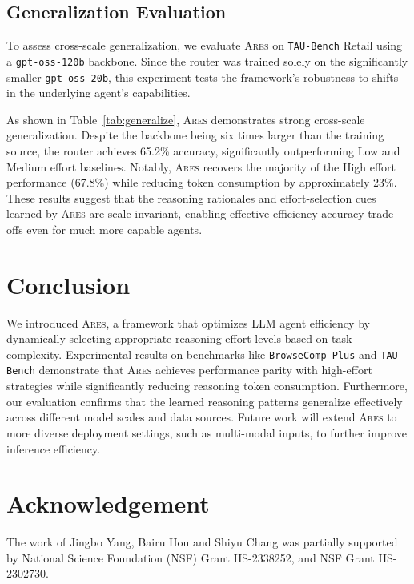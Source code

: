 \documentclass{article}
\newcommand{\ares}{\textsc{Ares}}
\theoremstyle{plain}
\theoremstyle{definition}
\theoremstyle{remark}
\begin{document}
\subsection{Generalization Evaluation}
To assess cross-scale generalization, we evaluate {\ares} on \texttt{TAU-Bench} Retail using a \texttt{gpt-oss-120b} backbone. Since the router was trained solely on the significantly smaller \texttt{gpt-oss-20b}, this experiment tests the framework's robustness to shifts in the underlying agent's capabilities.



As shown in Table~\ref{tab:generalize}, {\ares} demonstrates strong cross-scale generalization. Despite the backbone being six times larger than the training source, the router achieves 65.2\% accuracy, significantly outperforming Low and Medium effort baselines. Notably, {\ares} recovers the majority of the High effort performance (67.8\%) while reducing token consumption by approximately 23\%. These results suggest that the reasoning rationales and effort-selection cues learned by {\ares} are scale-invariant, enabling effective efficiency-accuracy trade-offs even for much more capable agents.

\section{Conclusion}

We introduced {\ares}, a framework that optimizes LLM agent efficiency by dynamically selecting appropriate reasoning effort levels based on task complexity. Experimental results on benchmarks like \texttt{BrowseComp-Plus} and \texttt{TAU-Bench} demonstrate that {\ares} achieves performance parity with high-effort strategies while significantly reducing reasoning token consumption. Furthermore, our evaluation confirms that the learned reasoning patterns generalize effectively across different model scales and data sources. Future work will extend {\ares} to more diverse deployment settings, such as multi-modal inputs, to further improve inference efficiency.



\section*{Acknowledgement}
The work of Jingbo Yang, Bairu Hou and Shiyu Chang was partially supported by National Science Foundation (NSF) Grant IIS-2338252, and NSF Grant IIS-2302730.
\end{document}
